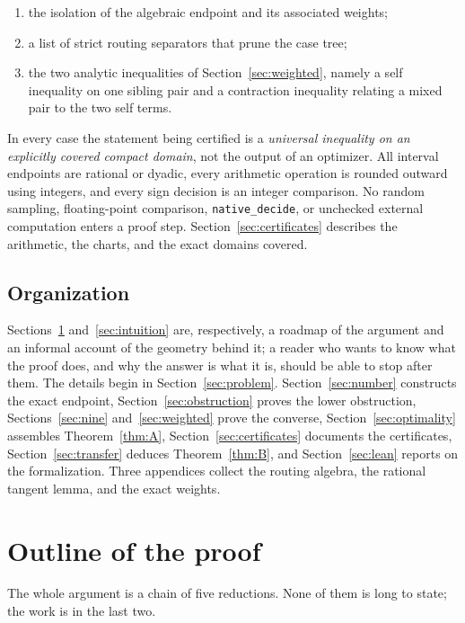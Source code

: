 \documentclass[11pt]{article}
\theoremstyle{plain}
\theoremstyle{definition}
\theoremstyle{remark}
\begin{document}
\begin{enumerate}
\item the isolation of the algebraic endpoint and its associated weights;
\item a list of strict routing separators that prune the case tree;
\item the two analytic inequalities of Section~\ref{sec:weighted}, namely a
      self inequality on one sibling pair and a contraction inequality
      relating a mixed pair to the two self terms.
\end{enumerate}

In every case the statement being certified is a \emph{universal
inequality on an explicitly covered compact domain}, not the output of an
optimizer.  All interval endpoints are rational or dyadic, every arithmetic
operation is rounded outward using integers, and every sign decision is an
integer comparison.  No random sampling, floating-point comparison,
\texttt{native\_decide}, or unchecked external computation enters a proof
step.  Section~\ref{sec:certificates} describes the arithmetic, the charts,
and the exact domains covered.

\subsection{Organization}

Sections~\ref{sec:outline} and~\ref{sec:intuition} are, respectively, a
roadmap of the argument and an informal account of the geometry behind it;
a reader who wants to know what the proof does, and why the answer is what
it is, should be able to stop after them.  The details begin in
Section~\ref{sec:problem}.  Section~\ref{sec:number} constructs the exact
endpoint, Section~\ref{sec:obstruction} proves the lower obstruction,
Sections~\ref{sec:nine} and~\ref{sec:weighted} prove the converse,
Section~\ref{sec:optimality} assembles Theorem~\ref{thm:A},
Section~\ref{sec:certificates} documents the certificates,
Section~\ref{sec:transfer} deduces Theorem~\ref{thm:B}, and
Section~\ref{sec:lean} reports on the formalization.  Three appendices
collect the routing algebra, the rational tangent lemma, and the exact
weights.

\section{Outline of the proof}\label{sec:outline}

The whole argument is a chain of five reductions.  None of them is long to
state; the work is in the last two.
\end{document}
